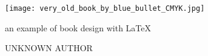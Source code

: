 \documentclass[11pt,oneside,final]{memoir}
\begin{document}
%
\centering%
%
\begin{minipage}[c][146mm][c]{\paperwidth}%
\centering%
\texttt{[image: very\_old\_book\_by\_blue\_bullet\_CMYK.jpg]}%
\end{minipage}

\vspace*{13mm}

{\titleFont\Huge\MakeUppercase{}}

\vspace*{\baselineskip}

{\subtitleFont\Large an example of book design with \LaTeX}

\vfill

{\authorFont\Large \MakeUppercase{Unknown Author}}

\vspace*{12mm}
\end{document}
